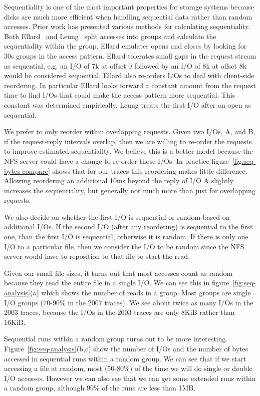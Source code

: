 Sequentiality is one of the most important properties for storage
systems because disks are much more efficient when handling sequential
data rather than random accesses.  Prior work has presented
various methods for calculating sequentiality.  Both
Ellard~\cite{EllardFast03} and Leung~\cite{LeungUsenix08} split accesses
into groups and calculate the sequentiality within the group.  Ellard
emulates opens and closes by looking for 30s groups in the access
pattern.  Ellard tolerates small gaps in the request stream as
sequential, e.g. an I/O of 7k at offset 0 followed by an I/O of 8k at
offset 8k would be considered sequential.  Ellard also re-orders I/Os
to deal with client-side reordering. In particular Ellard looks
forward a constant amount from the request time to find I/Os that
could make the access pattern more sequential.  This constant was
determined empirically.  Leung treats the first I/O after an open as
sequential.

We prefer to only reorder within overlapping requests. Given two I/Os,
A, and B, if the request-reply intervals overlap, then we are willing
to re-order the requests to improve estimated sequentiality.  We
believe this is a better model because the NFS server could have a
change to re-order those I/Os.  In practice
figure~\ref{fig:seq-bytes-compare} shows that for our traces this
reordering makes little difference.  Allowing reordering an additional
10ms beyond the reply of I/O A slightly increases the sequentiality,
but generally not much more than just for overlapping requests.

We also decide on whether the first I/O is sequential or random based
on additional I/Os.  If the second I/O (after any reordering) is
sequential to the first one, than the first I/O is sequential,
otherwise it is random.  If there is only one I/O to a particular
file, then we consider the I/O to be random since the NFS server would
have to reposition to that file to start the read.  

Given our small file sizes, it turns out that most accesses count as
random because they read the entire file in a single I/O.  We can see
this in figure~\ref{fig:seq-analysis}(a) which shows the number of
reads in a group.  Most groups are single I/O groups (70-90\% in the
2007 traces).  We see about twice as many I/Os in the 2003 traces,
because the I/Os in the 2003 traces are only 8KiB rather than 16KiB.

Sequential runs within a random group turns out to be more
interesting.  Figure~\ref{fig:seq-analysis}(b,c) show the number of
I/Os and the number of bytes accessed in sequential runs within a
random group.  We can see that if we start accessing a file at random,
most (50-80\%) of the time we will do single or double I/O accesses.
However we can also see that we can get some extended runs within a
random group, although 99\% of the runs are less than 1MB.

